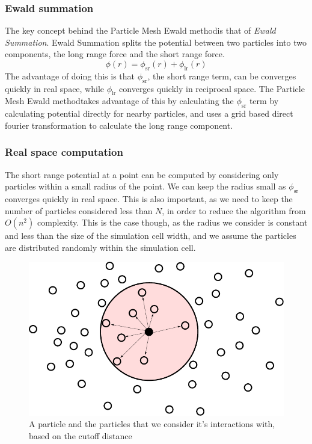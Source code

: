 \documentclass[pdftex,twoside,a4paper]{report}
\newcommand{\bcen}{\begin{center}}
\newcommand{\ecen}{\end{center}}
\newcommand{\pmem}{Particle Mesh Ewald method}
\begin{document}
\subsubsection{Ewald summation}
The key concept behind the \pmem is that of \emph{Ewald Summation}. Ewald Summation splits the potential between two particles into two components, the long range force and the short range force. \cite{petersen:3668}
\[
\phi(r) = \phi_{\text{sr}}(r) + \phi_{\text{lr}}(r)
\]
The advantage of doing this is that $\phi_{\text{sr}}$, the short range term, can be converges quickly in real space, while $\phi_{\text{lr}}$ converges quickly in reciprocal space. The \pmem takes advantage of this by calculating the $\phi_{\text{sr}}$ term by calculating potential directly for nearby particles, and uses a grid based direct fourier transformation to calculate the long range component.
\subsubsection{Real space computation}
The short range potential at a point can be computed by considering only particles within a small radius of the point. We can keep the radius small as $\phi_{\text{sr}}$ converges quickly in real space. This is also important, as we need to keep the number of particles considered less than $N$, in order to reduce the algorithm from $O(n^2)$ complexity. This is the case though, as the radius we consider is constant and less than the size of the simulation cell width, and we assume the particles are distributed randomly within the simulation cell.
\begin{figure}[h]
\bcen \includegraphics{figures/cutoff.pdf} \ecen
\caption{A particle and the particles that we consider it's interactions with, based on the cutoff distance}
\end{figure}
\end{document}
